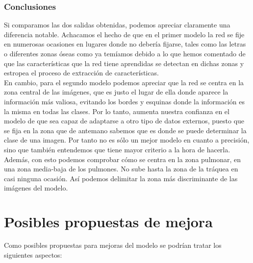 \documentclass[11pt,a4paper]{article}
\theoremstyle{definition}
\begin{document}
\newpage
\subsubsection{Conclusiones}

Si comparamos las dos salidas obtenidas, podemos apreciar claramente una diferencia notable.  Achacamos el hecho de que en el primer modelo la red se fije en numerosas ocasiones en lugares donde no debería fijarse, tales como las letras o diferentes zonas óseas como ya temíamos debido a lo que hemos comentado de que las características que la red tiene aprendidas se detectan en dichas zonas y estropea el proceso de extracción de características.\\

En cambio, para el segundo modelo podemos apreciar que la red se centra en la zona central de las imágenes, que es justo el lugar de ella donde aparece la información más valiosa, evitando los bordes y esquinas donde la información es la misma en todas las clases.  Por lo tanto, aumenta nuestra confianza en el modelo de que sea capaz de adaptarse a otro tipo de datos externos, puesto que se fija en la zona que de antemano sabemos que es donde se puede determinar la clase de una imagen.  Por tanto no es sólo un mejor modelo en cuanto a precisión, sino que también entendemos que tiene mayor criterio a la hora de hacerla. Además, con esto podemos comprobar cómo se centra en la zona pulmonar,  en una zona media-baja de los pulmones.  No sube hasta la zona de la tráquea en casi ninguna ocasión. Así podemos delimitar la zona más discriminante de las imágenes del modelo.

\section{Posibles propuestas de mejora}

Como posibles propuestas para mejoras del modelo se podrían tratar los siguientes aspectos:
\end{document}
